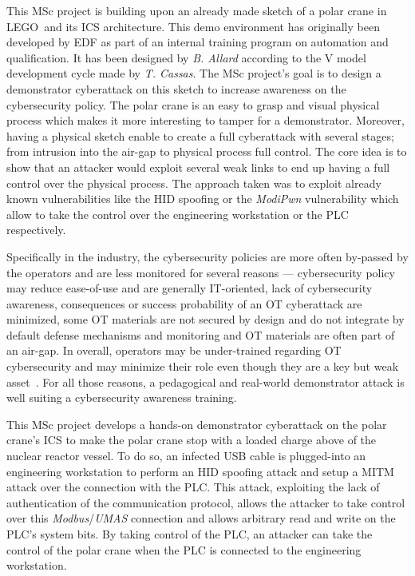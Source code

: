 
This MSc project is building upon an already made sketch of a polar crane in LEGO\texttrademark\ and its ICS architecture. This demo environment has originally been developed by EDF as part of an internal training program on automation and qualification. It has been designed by \emph{B. Allard} according to the V model development cycle made by \emph{T. Cassas}. The MSc project's goal is to design a demonstrator cyberattack on this sketch to increase awareness on the cybersecurity policy. The polar crane is an easy to grasp and visual physical process which makes it more interesting to tamper for a demonstrator. Moreover, having a physical sketch enable to create a full cyberattack with several stages; from intrusion into the air-gap to physical process full control. The core idea is to show that an attacker would exploit several weak links to end up having a full control over the physical process. The approach taken was to exploit already known vulnerabilities like the HID spoofing or the \emph{ModiPwn} vulnerability which allow to take the control over the engineering workstation or the PLC respectively.

Specifically in the industry, the cybersecurity policies are more often by-passed by the operators and are less monitored for several reasons — cybersecurity policy may reduce ease-of-use and are generally IT-oriented, lack of cybersecurity awareness, consequences or success probability of an OT cyberattack are minimized, some OT materials are not secured by design and do not integrate by default defense mechanisms and monitoring and OT materials are often part of an air-gap. In overall, operators may be under-trained regarding OT cybersecurity and may minimize their role even though they are a key but weak asset~\cite{Rahman21}. For all those reasons, a pedagogical and real-world demonstrator attack is well suiting a cybersecurity awareness training.  



This MSc project develops a hands-on demonstrator cyberattack on the polar crane's ICS to make the polar crane stop with a loaded charge above of the nuclear reactor vessel. To do so, an infected USB cable is plugged-into an engineering workstation to perform an HID spoofing attack and setup a MITM attack over the connection with the PLC. This attack, exploiting the lack of authentication of the communication protocol, allows the attacker to take control over this \emph{Modbus}/\emph{UMAS} connection and allows arbitrary read and write on the PLC's system bits. By taking control of the PLC, an attacker can take the control of the polar crane when the PLC is connected to the engineering workstation. 

